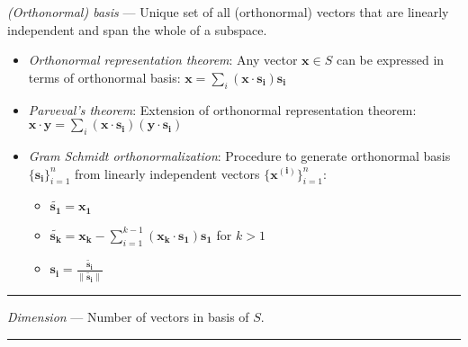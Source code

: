 \emph{(Orthonormal) basis} --- Unique set of all (orthonormal) vectors that are linearly independent and span the whole of a subspace.
\begin{itemize}
    \item \emph{Orthonormal representation theorem}: Any vector $\boldsymbol{x} \in S$ can be expressed in terms of orthonormal basis: $\boldsymbol{x} = \sum_i (\boldsymbol{x} \cdot \boldsymbol{s_i})\boldsymbol{s_i}$
    \item \emph{Parveval's theorem}: Extension of orthonormal representation theorem: $\boldsymbol{x} \cdot \boldsymbol{y} = \sum_i (\boldsymbol{x} \cdot \boldsymbol{s_i})(\boldsymbol{y} \cdot \boldsymbol{s_i})$
    \item \emph{Gram Schmidt orthonormalization}: Procedure to generate orthonormal basis $\{\boldsymbol{s_i}\}_{i=1}^n$ from linearly independent vectors $\{\boldsymbol{x^{(i)}}\}_{i=1}^n$:
    \begin{itemize}
        \item $\boldsymbol{\tilde{s_1}} = \boldsymbol{x_1}$
        \item $\boldsymbol{\tilde{s_k}} = \boldsymbol{x_k} - \sum_{i=1}^{k-1} (\boldsymbol{x_k} \cdot \boldsymbol{s_1})\boldsymbol{s_1}$ for $k > 1$
        \item $\boldsymbol{s_i} = \frac{\boldsymbol{\tilde{s_i}}}{\|\boldsymbol{\tilde{s_i}}\|}$
    \end{itemize}    
\end{itemize}

{\color{lightgray}\hrule height 0.001mm}

\emph{Dimension} --- Number of vectors in basis of $S$.

{\color{lightgray}\hrule height 0.001mm}

